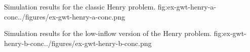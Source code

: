 

\begin{StandardFigure}{
                                     Simulation results for the classic Henry problem.
                                     }{fig:ex-gwt-henry-a-conc}{../figures/ex-gwt-henry-a-conc.png}
\end{StandardFigure}                                 

\begin{StandardFigure}{
                                    Simulation results for the low-inflow version of the Henry problem.
                                     }{fig:ex-gwt-henry-b-conc}{../figures/ex-gwt-henry-b-conc.png}
\end{StandardFigure}                                 

                      
